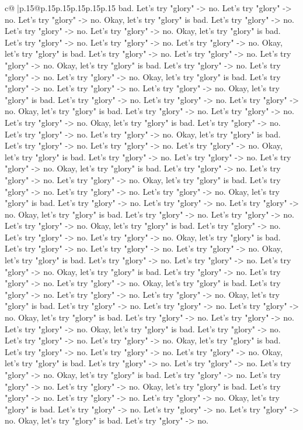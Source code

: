\documentclass{article}
\begin{document}
{\begin{supertabular}{c@{$\;$}|p{.15\linewidth}@{}p{.15\linewidth}p{.15\linewidth}p{.15\linewidth}p{.15\linewidth}p{.15\linewidth}}
{{{bad. Let's try "glory" {-}> no. Let's try "glory" {-}> no. Let's try "glory" {-}> no. Okay, let's try "glory" is bad. Let's try "glory" {-}> no. Let's try "glory" {-}> no. Let's try "glory" {-}> no. Okay, let's try "glory" is bad. Let's try "glory" {-}> no. Let's try "glory" {-}> no. Let's try "glory" {-}> no. Okay, let's try "glory" is bad. Let's try "glory" {-}> no. Let's try "glory" {-}> no. Let's try "glory" {-}> no. Okay, let's try "glory" is bad. Let's try "glory" {-}> no. Let's try "glory" {-}> no. Let's try "glory" {-}> no. Okay, let's try "glory" is bad. Let's try "glory" {-}> no. Let's try "glory" {-}> no. Let's try "glory" {-}> no. Okay, let's try "glory" is bad. Let's try "glory" {-}> no. Let's try "glory" {-}> no. Let's try "glory" {-}> no. Okay, let's try "glory" is bad. Let's try "glory" {-}> no. Let's try "glory" {-}> no. Let's try "glory" {-}> no. Okay, let's try "glory" is bad. Let's try "glory" {-}> no. Let's try "glory" {-}> no. Let's try "glory" {-}> no. Okay, let's try "glory" is bad. Let's try "glory" {-}> no. Let's try "glory" {-}> no. Let's try "glory" {-}> no. Okay, let's try "glory" is bad. Let's try "glory" {-}> no. Let's try "glory" {-}> no. Let's try "glory" {-}> no. Okay, let's try "glory" is bad. Let's try "glory" {-}> no. Let's try "glory" {-}> no. Let's try "glory" {-}> no. Okay, let's try "glory" is bad. Let's try "glory" {-}> no. Let's try "glory" {-}> no. Let's try "glory" {-}> no. Okay, let's try "glory" is bad. Let's try "glory" {-}> no. Let's try "glory" {-}> no. Let's try "glory" {-}> no. Okay, let's try "glory" is bad. Let's try "glory" {-}> no. Let's try "glory" {-}> no. Let's try "glory" {-}> no. Okay, let's try "glory" is bad. Let's try "glory" {-}> no. Let's try "glory" {-}> no. Let's try "glory" {-}> no. Okay, let's try "glory" is bad. Let's try "glory" {-}> no. Let's try "glory" {-}> no. Let's try "glory" {-}> no. Okay, let's try "glory" is bad. Let's try "glory" {-}> no. Let's try "glory" {-}> no. Let's try "glory" {-}> no. Okay, let's try "glory" is bad. Let's try "glory" {-}> no. Let's try "glory" {-}> no. Let's try "glory" {-}> no. Okay, let's try "glory" is bad. Let's try "glory" {-}> no. Let's try "glory" {-}> no. Let's try "glory" {-}> no. Okay, let's try "glory" is bad. Let's try "glory" {-}> no. Let's try "glory" {-}> no. Let's try "glory" {-}> no. Okay, let's try "glory" is bad. Let's try "glory" {-}> no. Let's try "glory" {-}> no. Let's try "glory" {-}> no. Okay, let's try "glory" is bad. Let's try "glory" {-}> no. Let's try "glory" {-}> no. Let's try "glory" {-}> no. Okay, let's try "glory" is bad. Let's try "glory" {-}> no. Let's try "glory" {-}> no. Let's try "glory" {-}> no. Okay, let's try "glory" is bad. Let's try "glory" {-}> no. Let's try "glory" {-}> no. Let's try "glory" {-}> no. Okay, let's try "glory" is bad. Let's try "glory" {-}> no. Let's try "glory" {-}> no. Let's try "glory" {-}> no. Okay, let's try "glory" is bad. Let's try "glory" {-}> no. Let's try "glory" {-}> no. Let's try "glory" {-}> no. Okay, let's try "glory" is bad. Let's try "glory" {-}> no. Let's try "glory" {-}> no. Let's try "glory" {-}> no. Okay, let's try "glory" is bad. Let's try "glory" {-}> no. }}}
\end{supertabular}}
\end{document}
